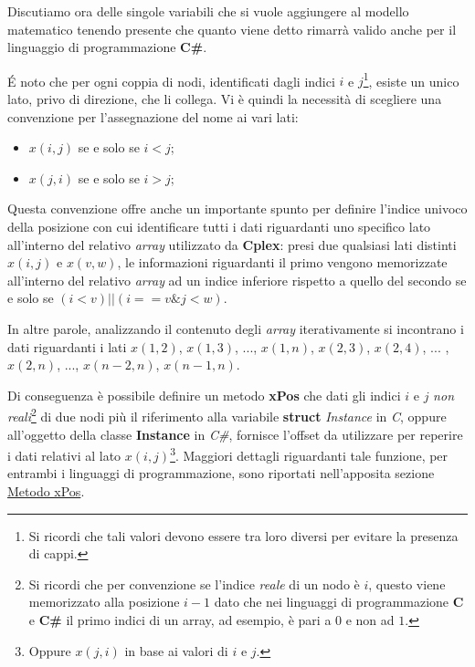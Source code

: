 \documentclass[11pt]{article}
\begin{document}
Discutiamo ora delle singole variabili che si vuole aggiungere al modello matematico tenendo presente che quanto viene detto rimarrà valido anche per il linguaggio di programmazione \textbf{C\#}.

\'E noto che per ogni coppia di nodi, identificati dagli indici $i$ e $j$\footnote{Si ricordi che tali valori devono essere tra loro diversi per evitare la presenza di cappi.}, esiste un unico lato, privo di direzione, che li collega. Vi è quindi la necessità di scegliere una convenzione per l'assegnazione del nome ai vari lati:

\begin{itemize}
    \item \textbf{$x(i,j)$} se e solo se $i < j$;
    \item \textbf{$x(j,i)$} se e solo se $i > j$;
\end{itemize}

Questa convenzione offre anche un importante spunto per definire l'indice univoco della posizione con cui identificare tutti i dati riguardanti uno specifico lato all'interno del relativo \textit{array} utilizzato da \textbf{Cplex}: presi due qualsiasi lati distinti $x(i,j)$ e $x(v,w)$, le informazioni riguardanti il primo vengono memorizzate all'interno del relativo \textit{array} ad un indice inferiore rispetto a quello del secondo se e solo se $(i<v) || (i==v \& j<w)$.

In altre parole, analizzando il contenuto degli \textit{array} iterativamente si incontrano i dati riguardanti i lati $x(1,2)$, $x(1,3)$, ..., $x(1,n)$, $x(2,3)$, $x(2,4)$, ... , $x(2,n)$, ..., $x(n-2,n)$, $x(n-1,n)$.

Di conseguenza è possibile definire un metodo \textbf{xPos} che dati gli indici $i$ e $j$ \textit{non reali}\footnote{Si ricordi che per convenzione se l'indice \textit{reale} di un nodo è $i$, questo viene memorizzato alla posizione $i-1$ dato che nei linguaggi di programmazione \textbf{C} e \textbf{C\#} il primo indici di un array, ad esempio, è pari a $0$ e non ad $1$.} di due nodi più il riferimento alla variabile \textbf{struct} \textit{Instance} in \textit{C}, oppure all'oggetto della classe \textbf{Instance} in \textit{C\#}, fornisce l'offset da utilizzare per reperire i dati relativi al lato $x(i,j)$\footnote{Oppure $x(j,i)$ in base ai valori di $i$ e $j$.}. Maggiori dettagli riguardanti tale funzione, per entrambi i linguaggi di programmazione, sono riportati nell'apposita sezione \hyperref[sec:XPos]{Metodo xPos}.
\end{document}
